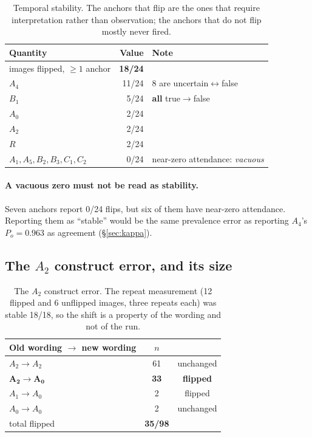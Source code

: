 \begin{table}[H]
\centering\small
\begin{tabularx}{\linewidth}{@{}lrX@{}}
\toprule
Quantity & Value & Note \\
\midrule
images flipped, $\ge1$ anchor & \textbf{18/24} & \\
$A_4$ & 11/24 & 8 are uncertain$\leftrightarrow$false \\
$B_1$ & 5/24 & \textbf{all} true$\to$false \\
$A_0$ & 2/24 & \\
$A_2$ & 2/24 & \\
$R$ & 2/24 & \\
$A_1,A_5,B_2,B_3,C_1,C_2$ & 0/24 & near-zero attendance: \emph{vacuous} \\
\bottomrule
\end{tabularx}
\caption{Temporal stability. The anchors that flip are the ones that require
interpretation rather than observation; the anchors that do not flip mostly
never fired.}
\label{tab:temporal}
\end{table}

\paragraph{A vacuous zero must not be read as stability.} Seven anchors report
0/24 flips, but six of them have near-zero attendance. Reporting them as
``stable'' would be the same prevalence error as reporting $A_4$'s $P_o=0.963$
as agreement (\S\ref{sec:kappa}).

\subsection{The $A_2$ construct error, and its size}

\begin{table}[H]
\centering\small
\begin{tabular}{@{}lcc@{}}
\toprule
Old wording $\to$ new wording & $n$ & \\
\midrule
$A_2\to A_2$ & 61 & unchanged \\
$\boldsymbol{A_2\to A_0}$ & \textbf{33} & \textbf{flipped} \\
$A_1\to A_0$ & 2 & flipped \\
$A_0\to A_0$ & 2 & unchanged \\
\midrule
total flipped & \textbf{35/98} & \\
\bottomrule
\end{tabular}
\caption{The $A_2$ construct error. The repeat measurement (12 flipped and 6
unflipped images, three repeats each) was stable 18/18, so the shift is a
property of the wording and not of the run.}
\label{tab:wardrobe}
\end{table}

